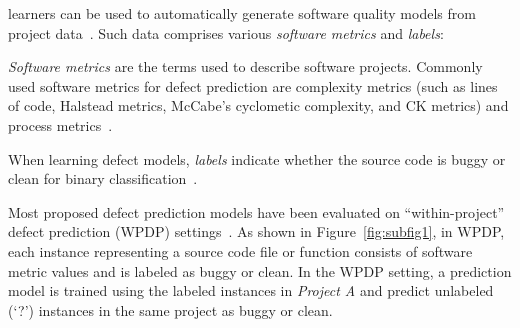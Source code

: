 
 learners can be used to automatically generate software quality
models from project data~\cite{DAmbros12,Menzies07}. 
Such data comprises  various {\em software metrics} and {\em labels}:
\squishlist
\item
{\em Software metrics} are the terms used to describe software projects. Commonly
used software metrics for defect prediction are complexity metrics (such as lines of code, Halstead
metrics, McCabe's cyclometic complexity, and CK metrics) and
process metrics~\cite{Basili96,Halstead77,McCabe76,Rahman13}.
\item
When learning defect models,
{\em labels} indicate
whether the source code is buggy or clean for binary
classification~\cite{Lee11,Nam13}.
\squishend

\noindent
Most proposed defect prediction models have been evaluated on
``within-project'' defect prediction (WPDP)
settings~\cite{DAmbros12,Lee11,Menzies07}.
As shown
in Figure~\ref{fig:subfig1}, in WPDP,  each instance representing a source code file or
function consists of software metric values and is labeled as buggy or clean.
In the WPDP setting, a prediction model is
trained using the labeled instances in {\em Project A} and predict unlabeled (`?')
instances in the same project as buggy or clean.


